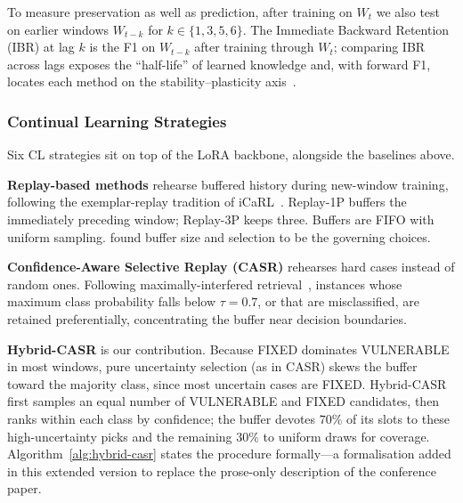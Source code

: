 \documentclass[a4paper,twoside]{article}
\begin{document}
\noindent
To measure preservation as well as prediction, after training on $W_t$ we also test on earlier windows $W_{t-k}$ for $k \in \{1,3,5,6\}$. The Immediate Backward Retention (IBR) at lag $k$ is the F1 on $W_{t-k}$ after training through $W_t$; comparing IBR across lags exposes the ``half-life'' of learned knowledge and, with forward F1, locates each method on the stability--plasticity axis~\citep{VandeVen2022CLSurvey}.

\subsubsection{Continual Learning Strategies}
\label{sec:cl-strategies}

\noindent
Six CL strategies sit on top of the LoRA backbone, alongside the baselines above.

\textbf{Replay-based methods} rehearse buffered history during new-window training, following the exemplar-replay tradition of iCaRL~\citep{Rebuffi2017iCaRL}. Replay-1P buffers the immediately preceding window; Replay-3P keeps three. Buffers are FIFO with uniform sampling. \citet{Han2023CLCompare} found buffer size and selection to be the governing choices.

\textbf{Confidence-Aware Selective Replay (CASR)} rehearses hard cases instead of random ones. Following maximally-interfered retrieval~\citep{Aljundi2019MIR}, instances whose maximum class probability falls below $\tau=0.7$, or that are misclassified, are retained preferentially, concentrating the buffer near decision boundaries.

\textbf{Hybrid-CASR} is our contribution. Because FIXED dominates VULNERABLE in most windows, pure uncertainty selection (as in CASR) skews the buffer toward the majority class, since most uncertain cases are FIXED. Hybrid-CASR first samples an equal number of VULNERABLE and FIXED candidates, then ranks within each class by confidence; the buffer devotes $70\%$ of its slots to these high-uncertainty picks and the remaining $30\%$ to uniform draws for coverage. Algorithm~\ref{alg:hybrid-casr} states the procedure formally---a formalisation added in this extended version to replace the prose-only description of the conference paper.
\end{document}
